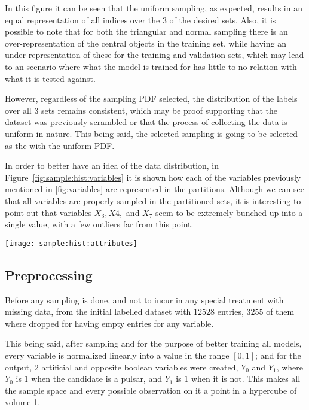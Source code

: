 \documentclass[journal]{IEEEtran}
\begin{document}
In this figure it can be seen that the uniform sampling, as expected, results in
an equal representation of all indices over the $3$ of the desired sets. Also,
it is possible to note that for both the triangular and normal sampling there is
an over-representation of the central objects in the training set, while having
an under-representation of these for the training and validation sets, which may
lead to an scenario where what the model is trained for has little to no
relation with what it is tested against.

However, regardless of the sampling PDF selected, the distribution of the labels
over all $3$ sets remains consistent, which may be proof supporting that the
dataset was previously scrambled or that the process of collecting the data is
uniform in nature. This being said, the selected sampling is going to be
selected as the with the uniform PDF.

In order to better have an idea of the data distribution, in
Figure~\ref{fig:sample:hist:variables} it is shown how each of the variables
previously mentioned in \ref{fig:variables} are represented in the partitions.
Although we can see that all variables are properly sampled in the partitioned
sets, it is interesting to point out that variables $X_3, X4,$ and $X_7$ seem to
be extremely bunched up into a single value, with a few outliers far from this
point. 

\begin{figure*}[ht]
    \texttt{[image: sample:hist:attributes]}
    \caption{Example of a figure caption. \label{fig:sample:hist:variables}}
\end{figure*}

\subsection{Preprocessing\label{sec:preprocess}}

Before any sampling is done, and not to incur in any special treatment with
missing data, from the initial labelled dataset with $12528$ entries, $3255$ of
them where dropped for having empty entries for any variable. 

This being said, after sampling and for the purpose of better training all
models, every variable is normalized linearly into a value in the range
$[0,1]$; and for the output, 2 artificial and opposite boolean variables were
created, $Y_0$ and $Y_1$, where $Y_0$ is $1$ when the candidate is a pulsar, and
$Y_1$ is $1$ when it is not. This makes all the sample space and every possible
observation on it a point in a hypercube of volume 1.
\end{document}
